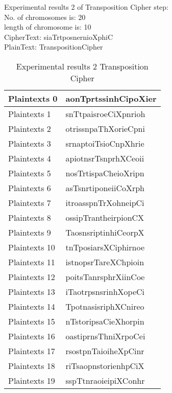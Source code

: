 \textsf{Experimental results 2 of Transposition Cipher step:}\\
    \colorbox{blue!30}{\textsf{     No. of chromosomes is: 20}}\\
    \colorbox{blue!30}{\textsf{     length of chromosome is: 10}}\\
    \colorbox{blue!30}{\textsf{     CipherText: siaTrtposnernioXphiC}}\\
    \colorbox{blue!30}{\textsf{     PlainText: TranspositionCipher}}
\begin{table}[h!]
\centering
\begin{tabular}{l l}\hline
    Plaintexts 0&aonTprtssinhCipoXier\\ \hline
    Plaintexts 1&snTtpaisroeCiXpnrioh\\ \hline
    Plaintexts 2&otrissnpaThXorieCpni\\ \hline
    Plaintexts 3&srnaptoiTsioCnpXhrie\\ \hline
    Plaintexts 4&apiotnsrTsnprhXCeoii\\ \hline
    Plaintexts 5&nosTrtispaCheioXripn\\ \hline
    Plaintexts 6&asTsnrtiponeiiCoXrph\\ \hline
    Plaintexts 7&itroasspnTrXohneipCi\\ \hline
    Plaintexts 8&ossipTrantheirpionCX\\ \hline
    Plaintexts 9&TaosnsriptinhiCeorpX\\ \hline
    Plaintexts 10&tnTposiarsXCiphirnoe\\ \hline
    Plaintexts 11&istnopsrTareXChpioin\\ \hline
    Plaintexts 12&poitsTanrsphrXiinCoe\\ \hline
    Plaintexts 13&iTaotrpsnsrinhXopeCi\\ \hline
    Plaintexts 14&TpotnasisriphXCnireo\\ \hline
    Plaintexts 15&nTstoripsaCieXhorpin\\ \hline
    Plaintexts 16&oastiprnsThniXrpoCei\\ \hline
    Plaintexts 17&rsostpnTaioiheXpCinr\\ \hline
    Plaintexts 18&riTsaopnstorienhpCiX\\ \hline
    Plaintexts 19&sspTtnraoieipiXConhr\\ \hline
\end{tabular}
\caption{Experimental results 2 Transposition Cipher}

\end{table}